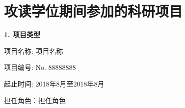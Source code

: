 \chapter{攻读学位期间参加的科研项目}

\textbf{1. 项目类型}

项目名称: 项目名称

项目编号: No. 88888888

起止时间: 2018年8月至2018年8月

担任角色：担任角色